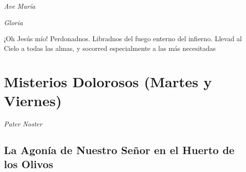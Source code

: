 \documentclass[a4paper,11pt, oneside]{report}
\begin{document}
        \textit{Ave María} \par
        \indent\textit{Gloria} \par
        \indent¡Oh Jesús mío! Perdonadnos. Libradnos del fuego enterno del infierno. Llevad al Cielo a todas las almas, y socorred especialmente a las más 
        necesitadas
        
    \section*{Misterios Dolorosos (Martes y Viernes)}
    
      \textit{Pater Noster}

      \subsection*{La Agonía de Nuestro Señor en el Huerto de los Olivos}
      
\end{document}
